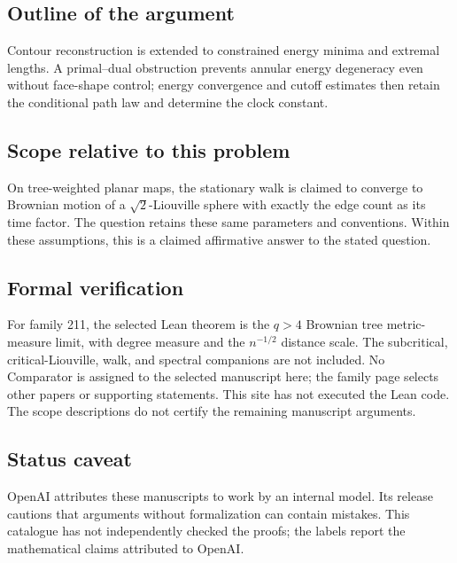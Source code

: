 \documentclass[11pt]{article}
\begin{document}
\subsection{Outline of the argument}
Contour reconstruction is extended to constrained energy minima and extremal lengths. A primal--dual obstruction prevents annular energy degeneracy even without face-shape control; energy convergence and cutoff estimates then retain the conditional path law and determine the clock constant.

\subsection{Scope relative to this problem}
On tree-weighted planar maps, the stationary walk is claimed to converge to Brownian motion of a $\sqrt2$-Liouville sphere with exactly the edge count as its time factor. The question retains these same parameters and conventions. Within these assumptions, this is a claimed affirmative answer to the stated question.

\subsection{Formal verification}
For family 211, the selected Lean theorem is the $q>4$ Brownian tree metric-measure limit, with degree measure and the $n^{-1/2}$ distance scale. The subcritical, critical-Liouville, walk, and spectral companions are not included. No Comparator is assigned to the selected manuscript here; the family page selects other papers or supporting statements. This site has not executed the Lean code. The scope descriptions do not certify the remaining manuscript arguments.

\subsection{Status caveat}
OpenAI attributes these manuscripts to work by an internal model. Its release cautions that arguments without formalization can contain mistakes. This catalogue has not independently checked the proofs; the labels report the mathematical claims attributed to OpenAI.
\end{document}
